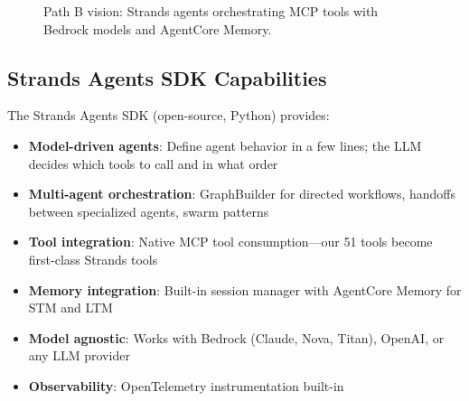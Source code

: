 \documentclass[11pt,letterpaper]{article}
\begin{document}
\begin{figure}[H]
\caption{Path B vision: Strands agents orchestrating MCP tools with Bedrock
models and AgentCore Memory.}
\label{fig:path-b-vision}
\end{figure}

\subsection{Strands Agents SDK Capabilities}

The Strands Agents SDK (open-source, Python) provides:

\begin{itemize}[noitemsep]
    \item \textbf{Model-driven agents}: Define agent behavior in a few lines;
          the LLM decides which tools to call and in what order
    \item \textbf{Multi-agent orchestration}: GraphBuilder for directed
          workflows, handoffs between specialized agents, swarm patterns
    \item \textbf{Tool integration}: Native MCP tool consumption---our 51
          tools become first-class Strands tools
    \item \textbf{Memory integration}: Built-in session manager with
          AgentCore Memory for STM and LTM
    \item \textbf{Model agnostic}: Works with Bedrock (Claude, Nova, Titan),
          OpenAI, or any LLM provider
    \item \textbf{Observability}: OpenTelemetry instrumentation built-in
\end{itemize}
\end{document}
